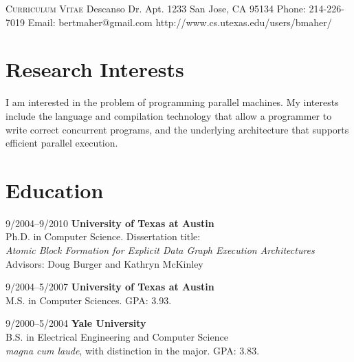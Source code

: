 \documentclass[11pt]{article}
\begin{document}
\singlespacing
\sffamily

\begin{multicols}{2}
\singlespacing
\noindent\Large{}
\color{black}
\vspace{5pt}\newline
\large{\textsc{Curriculum Vitae}} \newline\newline\newline
\normalsize {} Descanso Dr. Apt. 1233 \newline
\indent San Jose, CA 95134 \newline
\indent Phone:  214-226-7019 \newline
\indent Email:  bertmaher@gmail.com \newline
\indent http://www.cs.utexas.edu/users/bmaher/
\end{multicols}

\section{Research Interests}

\noindent I am interested in the problem of programming parallel machines.  My interests include the language and compilation technology that allow a programmer to write correct concurrent programs, and the underlying architecture that supports efficient parallel execution.

\section{Education}
\begin{CV}
\item[9/2004--9/2010] {\bfseries University of Texas at Austin} \\
Ph.D. in Computer Science.  Dissertation title: \\\textit{Atomic Block Formation for Explicit Data Graph Execution Architectures}\\
Advisors: Doug Burger and Kathryn McKinley
\item[9/2004--5/2007] {\bfseries University of Texas at Austin} \\
M.S. in Computer Sciences.  GPA: 3.93.
\item[9/2000--5/2004] {\bfseries Yale University} \\
B.S. in Electrical Engineering and Computer Science \\
\textit{magna cum laude}, with distinction in the major.  GPA: 3.83.
\end{CV}
\end{document}

